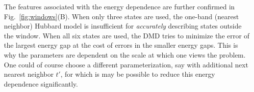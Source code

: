 The features associated with the energy dependence are further confirmed in Fig.~\ref{fig:windows}(B). 
When only three states are used, the one-band (nearest neighbor) Hubbard model is insufficient for \textit{accurately}
describing states outside the window. When all six states are used, the DMD tries to minimize the error of the 
largest energy gap at the cost of errors in the smaller energy gaps. This is why the parameters are dependent 
on the scale at which one views the problem. One could of course choose a different parameterization, say with 
additional next nearest neighbor $t'$, for which is may be possible to reduce this energy dependence significantly.
 
 
